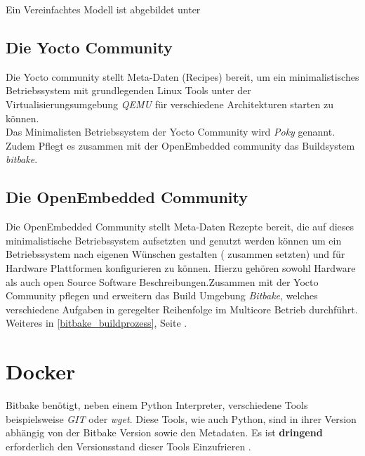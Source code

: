 Ein Vereinfachtes Modell ist abgebildet unter
\cite[S.26]{Gonzalez2018:Embedded_Linux_Development_Using_Yocto_Project_Cookbook_2nd}



\subsection{Die Yocto Community}%

Die Yocto community stellt Meta-Daten (Recipes) bereit, um ein minimalistisches
Betriebssystem mit grundlegenden  Linux Tools unter der Virtualisierungsumgebung
\textit{\gls{QEMU}} für verschiedene Architekturen starten zu können.  \\

Das Minimalisten Betriebssystem der Yocto Community wird \textit{\gls{Poky}}
genannt.  \\

Zudem Pflegt es zusammen mit der OpenEmbedded community das Buildsystem
\textit{bitbake}.

\subsection{Die OpenEmbedded Community}%
\label{sub:die_openembedded_community}


Die OpenEmbedded Community stellt Meta-Daten Rezepte bereit, die auf dieses
minimalistische Betriebssystem aufsetzten und genutzt werden können um ein
Betriebssystem nach eigenen Wünschen gestalten ( zusammen setzten) und für
Hardware Plattformen konfigurieren zu können. Hierzu gehören sowohl Hardware als
auch open Source Software Beschreibungen.Zusammen mit der Yocto Community
 pflegen und erweitern das Build Umgebung \textit{Bitbake}, welches
 verschiedene Aufgaben in geregelter Reihenfolge im Multicore Betrieb
 durchführt. Weiteres in \ref{bitbake_buildprozess}, Seite
 \pageref{bitbake_buildprozess}.




\section{Docker} \label{sec:docker} Bitbake benötigt, neben einem Python
Interpreter, verschiedene Tools beispielsweise \textit{GIT} oder \textit{wget}.
Diese Tools, wie auch Python, sind in ihrer Version abhängig von der Bitbake
Version sowie den Metadaten. Es ist \textbf{dringend} erforderlich den
Versionsstand dieser Tools \glqq Einzufrieren \grqq. \\



